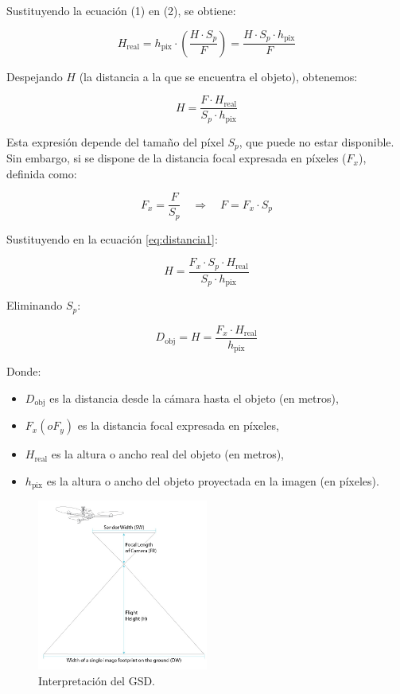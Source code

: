Sustituyendo la ecuación (1) en (2), se obtiene:

\begin{equation}
H_{\text{real}} = h_{\text{pix}} \cdot \left( \frac{H \cdot S_p}{F} \right)
= \frac{H \cdot S_p \cdot h_{\text{pix}}}{F}
\end{equation}

Despejando $H$ (la distancia a la que se encuentra el objeto), obtenemos:

\begin{equation}
H = \frac{F \cdot H_{\text{real}}}{S_p \cdot h_{\text{pix}}}
\label{eq:distancia1}
\end{equation}

Esta expresión depende del tamaño del píxel $S_p$, que puede no estar disponible. Sin embargo, si se dispone de la distancia focal expresada en píxeles ($F_x$), definida como:

\begin{equation}
F_x = \frac{F}{S_p} \quad \Rightarrow \quad F = F_x \cdot S_p
\end{equation}

Sustituyendo en la ecuación \eqref{eq:distancia1}:

\begin{equation}
H = \frac{F_x \cdot S_p \cdot H_{\text{real}}}{S_p \cdot h_{\text{pix}}}
\end{equation}

Eliminando $S_p$:

\begin{equation}
\boxed{
D_{\text{obj}} = H = \frac{F_x \cdot H_{\text{real}}}{h_{\text{pix}}}
}
\end{equation}

Donde:
\begin{itemize}
  \item $D_{\text{obj}}$ es la distancia desde la cámara hasta el objeto (en metros),
  \item $F_x (o F_y)$ es la distancia focal expresada en píxeles,
  \item $H_{\text{real}}$ es la altura o ancho real del objeto (en metros),
  \item $h_{\text{pix}}$ es la altura o ancho del objeto proyectada en la imagen (en píxeles).
\end{itemize}


\begin{figure}[H]
    \centering
    \includegraphics[width=0.5\textwidth]{images/gsd_drone_example.jpg}
    \caption{Interpretación del GSD.}
    \label{fig:gsd_example}
\end{figure}



